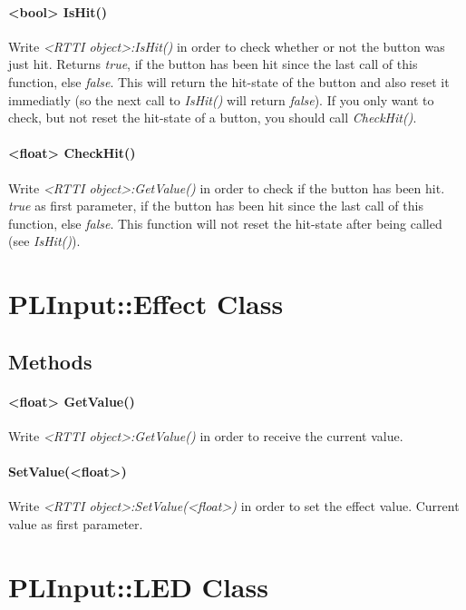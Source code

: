 \paragraph{<bool> IsHit()}
Write \emph{<RTTI object>:IsHit()} in order to check whether or not the button was just hit. Returns \emph{true}, if the button has been hit since the last call of this function, else \emph{false}. This will return the hit-state of the button and also reset it immediatly (so the next call to \emph{IsHit()} will return \emph{false}). If you only want to check, but not reset the hit-state of a button, you should call \emph{CheckHit()}.

\paragraph{<float> CheckHit()}
Write \emph{<RTTI object>:GetValue()} in order to check if the button has been hit. \emph{true} as first parameter, if the button has been hit since the last call of this function, else \emph{false}. This function will not reset the hit-state after being called (see \emph{IsHit()}).




\section{PLInput::Effect Class}


\subsection{Methods}

\paragraph{<float> GetValue()}
Write \emph{<RTTI object>:GetValue()} in order to receive the current value.

\paragraph{SetValue(<float>)}
Write \emph{<RTTI object>:SetValue(<float>)} in order to set the effect value. Current value as first parameter.




\section{PLInput::LED Class}


